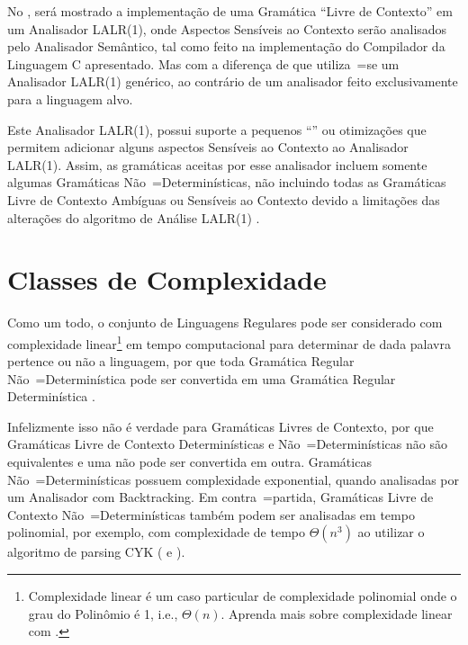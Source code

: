 No ,
será mostrado a implementação de uma Gramática ``Livre de Contexto'' em um Analisador LALR(1),
onde Aspectos Sensíveis ao Contexto serão analisados pelo Analisador Semântico,
tal como feito na implementação do Compilador da Linguagem C apresentado.
Mas com a diferença de que utiliza~=se um Analisador LALR(1) genérico,
ao contrário de um analisador feito exclusivamente para a linguagem alvo.

Este Analisador LALR(1),
possui suporte a pequenos ``\textit{}'' ou
otimizações que permitem adicionar alguns aspectos Sensíveis ao Contexto ao Analisador LALR(1).
Assim,
as gramáticas aceitas por esse analisador incluem somente algumas Gramáticas Não~=Determinísticas,
não incluindo todas as Gramáticas Livre de Contexto Ambíguas ou
Sensíveis ao Contexto devido a limitações das alterações do algoritmo de Análise LALR(1) \cite{larkContextualLexer}.


\section{Classes de Complexidade}
\label{classesDeComplexidade}

Como um todo,
o conjunto de Linguagens Regulares pode ser considerado com complexidade linear\footnote{
Complexidade linear é um caso particular de complexidade polinomial onde o grau do Polinômio é 1,
i.e.,
$\Theta(n)$.
Aprenda mais sobre complexidade linear com .
}
em tempo computacional para determinar de dada palavra pertence ou
não a linguagem,
por que toda Gramática Regular Não~=Determinística pode ser convertida em uma Gramática Regular Determinística \cite{sipserBook}.

Infelizmente isso não é verdade para Gramáticas Livres de Contexto,
por que Gramáticas Livre de Contexto Determinísticas e
Não~=Determinísticas não são equivalentes e
uma não pode ser convertida em outra.
Gramáticas Não~=Determinísticas possuem complexidade exponential,
quando analisadas por um Analisador com Backtracking.
Em contra~=partida,
Gramáticas Livre de Contexto Não~=Determinísticas também podem ser analisadas em tempo polinomial,
por exemplo,
com complexidade de tempo $\Theta(n^3)$ ao utilizar o algoritmo de parsing CYK ( e
).


